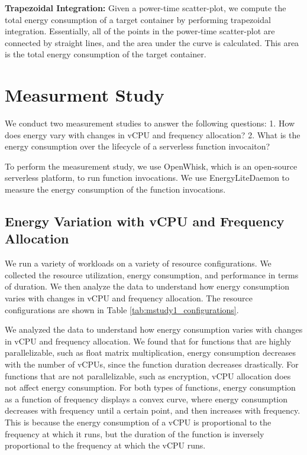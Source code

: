 \documentclass[times, 10pt,twocolumn]{article}
\begin{document}
\textbf{Trapezoidal Integration:} Given a power-time scatter-plot, we compute the total energy consumption of a target container by performing trapezoidal integration. Essentially, all of the points in the power-time scatter-plot are connected by straight lines, and the area under the curve is calculated. This area is the total energy consumption of the target container. 

\section{Measurment Study}

We conduct two measurement studies to answer the following questions: 1. How does energy vary with changes in vCPU and frequency allocation? 2. What is the energy consumption over the lifecycle of a serverless function invocaiton?

To perform the measurement study, we use OpenWhisk, which is an open-source serverless platform, to run function invocations. We use EnergyLiteDaemon to measure the energy consumption of the function invocations.

\subsection{Energy Variation with vCPU and Frequency Allocation}

We run a variety of workloads on a variety of resource configurations. We collected the resource utilization, energy consumption, and performance in terms of duration. We then analyze the data to understand how energy consumption varies with changes in vCPU and frequency allocation. The resource configurations are shown in Table \ref{tab:mstudy1_configurations}.

We analyzed the data to understand how energy consumption varies with changes in vCPU and frequency allocation. We found that for functions that are highly parallelizable, such as float matrix multiplication, energy consumption decreases with the number of vCPUs, since the function duration decreases drastically. For functions that are not parallelizable, such as encryption, vCPU allocation does not affect energy consumption. For both types of functions, energy consumption as a function of frequency displays a convex curve, where energy consumption decreases with frequency until a certain point, and then increases with frequency. This is because the energy consumption of a vCPU is proportional to the frequency at which it runs, but the duration of the function is inversely proportional to the frequency at which the vCPU runs.
\end{document}
